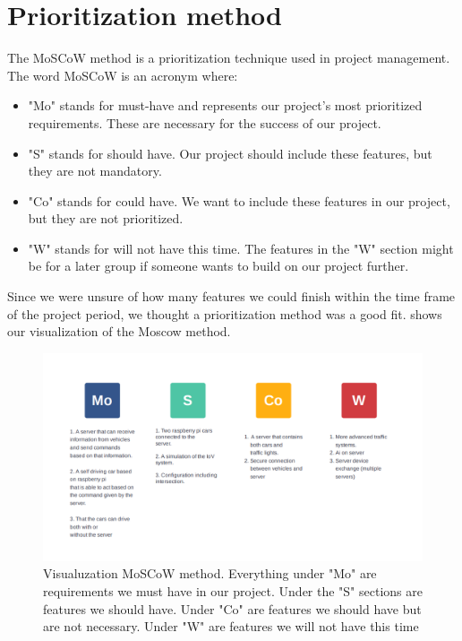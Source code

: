 \section{Prioritization method}
The MoSCoW method is a prioritization technique used in project management. The word MoSCoW is an acronym where:

\begin{itemize}
	\item "Mo" stands for must-have and represents our project's most prioritized requirements. These are necessary for the success of our project.
	\item "S" stands for should have. Our project should include these features, but they are not mandatory.
	\item "Co" stands for could have. We want to include these features in our project, but they are not prioritized.
	\item "W" stands for will not have this time. The features in the "W" section might be for a later group if someone wants to build on our project further.
\end{itemize}

Since we were unsure of how many features we could finish within the time frame of the project period, we thought a prioritization method was a good fit.  shows our visualization of the Moscow method.

\begin{figure}[h!]
	\centering
	\includegraphics[width=1\linewidth]{figures/MosCoW_method}
	\caption[MosCoW method]{Visualuzation MoSCoW method. Everything under "Mo" are requirements we must have in our project. Under the "S" sections are features we should have. Under "Co" are features we should have but are not necessary. Under "W" are features we will not have this time}
	\label{fig:moscowmethod}
\end{figure}



